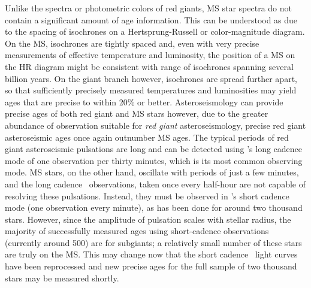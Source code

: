 Unlike the spectra or photometric colors of red giants, MS star spectra do not
contain a significant amount of age information.
This can be understood as due to the spacing of isochrones on a
Hertsprung-Russell or color-magnitude diagram.
On the MS, isochrones are tightly spaced and, even with very precise
measurements of effective temperature and luminosity, the position of a MS
on the HR diagram might be consistent with range of isochrones spanning
several billion years.
On the giant branch however, isochrones are spread further apart, so that
sufficiently precisely measured temperatures and luminosities may yield ages
that are precise to within 20\% or better.
Asteroseismology can provide precise ages of both red giant and MS stars
however, due to the greater abundance of observation suitable for {\it red
giant} asteroseismology, precise red giant asteroseismic ages once again
outnumber MS ages.
The typical periods of red giant asteroseismic pulsations are long and can be
detected using \kepler's long cadence mode of one observation per thirty
minutes, which is its most common observing mode.
MS stars, on the other hand, oscillate with periods of just a few minutes, and
the long cadence \kepler\ observations, taken once every half-hour are not
capable of resolving these pulsations.
Instead, they must be observed in \kepler's short cadence mode (one
observation every minute), as has been done for around two thousand stars.
However, since the amplitude of pulsation scales with stellar radius, the
majority of successfully measured ages using short-cadence observations
(currently around 500) are
for subgiants; a relatively small number of these stars are truly on the MS.
This may change now that the short cadence \kepler\ light curves have been
reprocessed and new precise ages for the full sample of two thousand stars may
be measured shortly.

